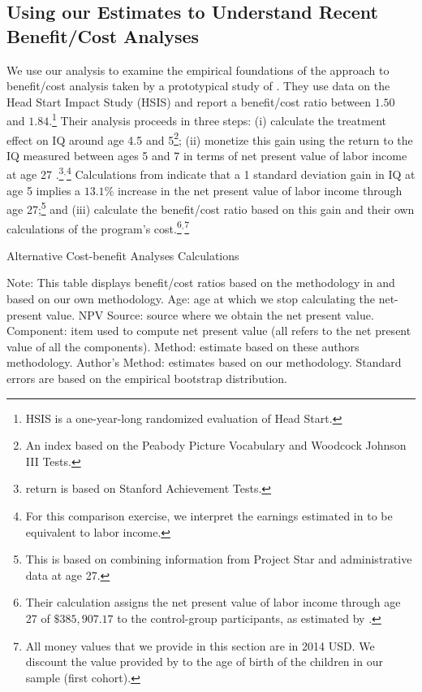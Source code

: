 \subsection{Using our Estimates to Understand Recent Benefit/Cost Analyses}

We use our analysis to examine the empirical foundations of the approach to benefit/cost analysis taken by a prototypical study of \citet{Kline_Walters_2016_QJE}. They use data on the Head Start Impact Study (HSIS) and report a benefit/cost ratio between $1.50$ and $1.84$.\footnote{HSIS is a one-year-long randomized evaluation of Head Start.} Their analysis proceeds in three steps: (i) calculate the treatment effect on IQ around age 4.5 and 5\footnote{An index based on the Peabody Picture Vocabulary and Woodcock Johnson III Tests.}; (ii) monetize this gain using the return to the IQ measured between ages 5 and 7 in terms of net present value of labor income at age 27 \citep{Chetty_Friedman_etal_2011_QJoE}.\footnote{\citet{Chetty_Friedman_etal_2011_QJoE} return is based on Stanford Achievement Tests.}$^,$\footnote{For this comparison exercise, we interpret the earnings estimated in \citet{Chetty_Friedman_etal_2011_QJoE} to be equivalent to labor income.} Calculations from \citet{Chetty_Friedman_etal_2011_QJoE} indicate that a 1 standard deviation gain in IQ at age 5 implies a $13.1\%$ increase in the net present value of labor income through age 27;\footnote{This is based on combining information from Project Star and administrative data at age 27.} and (iii) calculate the benefit/cost ratio based on this gain and their own calculations of the program's cost.\footnote{Their calculation assigns the net present value of labor income through age 27 of $\$385,907.17$ to the control-group participants, as estimated by  \citet{Chetty_Friedman_etal_2011_QJoE}.}$^,$\footnote{All money values that we provide in this section are in 2014 USD. We discount the value provided by \citet{Chetty_Friedman_etal_2011_QJoE} to the age of birth of the children in our sample (first cohort).}


\begin{table}[!htbp]
\begin{threeparttable}
\caption{Alternative Cost-benefit Analyses Calculations}
\label{table:comparing}
\centering
\footnotesize

\begin{tablenotes}
\footnotesize
\item Note: This table displays benefit/cost ratios based on the methodology in \citet{Kline_Walters_2016_QJE} and based on our own methodology. Age: age at which we stop calculating the net-present value. NPV Source: source where we obtain the net present value. Component: item used to compute net present value (all refers to the net present value of all the components). \citet{Kline_Walters_2016_QJE} Method: estimate based on these authors methodology. Author's Method: estimates based on our methodology. Standard errors are based on the empirical bootstrap distribution.
\end{tablenotes}
\end{threeparttable}
\end{table}

